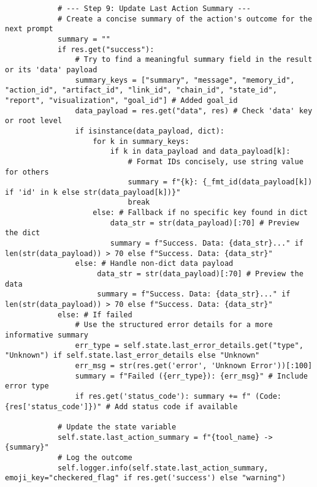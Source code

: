 \documentclass[12pt,a4paper]{article}
\begin{document}
\begin{pageablecode}
\begin{verbatim}
            # --- Step 9: Update Last Action Summary ---
            # Create a concise summary of the action's outcome for the next prompt
            summary = ""
            if res.get("success"):
                # Try to find a meaningful summary field in the result or its 'data' payload
                summary_keys = ["summary", "message", "memory_id", "action_id", "artifact_id", "link_id", "chain_id", "state_id", "report", "visualization", "goal_id"] # Added goal_id
                data_payload = res.get("data", res) # Check 'data' key or root level
                if isinstance(data_payload, dict):
                    for k in summary_keys:
                        if k in data_payload and data_payload[k]:
                            # Format IDs concisely, use string value for others
                            summary = f"{k}: {_fmt_id(data_payload[k]) if 'id' in k else str(data_payload[k])}"
                            break
                    else: # Fallback if no specific key found in dict
                        data_str = str(data_payload)[:70] # Preview the dict
                        summary = f"Success. Data: {data_str}..." if len(str(data_payload)) > 70 else f"Success. Data: {data_str}"
                else: # Handle non-dict data payload
                     data_str = str(data_payload)[:70] # Preview the data
                     summary = f"Success. Data: {data_str}..." if len(str(data_payload)) > 70 else f"Success. Data: {data_str}"
            else: # If failed
                # Use the structured error details for a more informative summary
                err_type = self.state.last_error_details.get("type", "Unknown") if self.state.last_error_details else "Unknown"
                err_msg = str(res.get('error', 'Unknown Error'))[:100]
                summary = f"Failed ({err_type}): {err_msg}" # Include error type
                if res.get('status_code'): summary += f" (Code: {res['status_code']})" # Add status code if available

            # Update the state variable
            self.state.last_action_summary = f"{tool_name} -> {summary}"
            # Log the outcome
            self.logger.info(self.state.last_action_summary, emoji_key="checkered_flag" if res.get('success') else "warning")



\end{verbatim}
\end{pageablecode}
\end{document}
